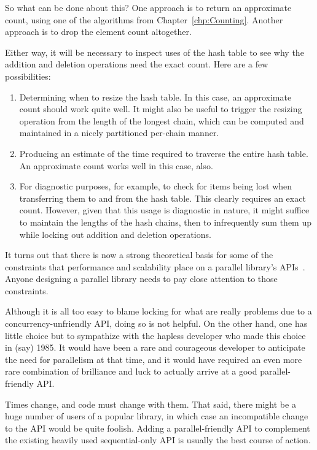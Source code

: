 So what can be done about this?
One approach is to return an approximate count, using one of the algorithms
from Chapter~\ref{chp:Counting}.
Another approach is to drop the element count altogether.

Either way, it will be necessary to inspect uses of the hash table to see
why the addition and deletion operations need the exact count.
Here are a few possibilities:

\begin{enumerate}
\item	Determining when to resize the hash table.
	In this case, an approximate count should work quite well.
	It might also be useful to trigger the resizing operation from
	the length of the longest chain, which can be computed and
	maintained in a nicely partitioned per-chain manner.
\item	Producing an estimate of the time required to traverse the
	entire hash table.
	An approximate count works well in this case, also.
\item	For diagnostic purposes, for example, to check for items being
	lost when transferring them to and from the hash table.
	This clearly requires an exact count.
	However, given that this usage is diagnostic in nature, it might
	suffice to maintain the lengths of the hash chains, then to
	infrequently sum them
	up while locking out addition and deletion operations.
\end{enumerate}

It turns out that there is now a strong theoretical basis for some of the
constraints that performance and scalability place on a parallel library's
APIs~\cite{HagitAttiya2011LawsOfOrder,Attiya:2011:LOE:1925844.1926442,PaulEMcKenney2011SNC}.
Anyone designing a parallel library needs to pay close attention to
those constraints.

Although it is all too easy to blame locking for what are really problems
due to a concurrency-unfriendly API, doing so is not helpful.
On the other hand, one has little choice but to sympathize with the
hapless developer who made this choice in (say) 1985.
It would have been a rare and courageous developer to anticipate the
need for parallelism at that time, and it would have required an
even more rare combination of brilliance and luck to actually arrive
at a good parallel-friendly API\@.

Times change, and code must change with them.
That said, there might be a huge number of users of a popular library,
in which case an incompatible change to the API would be quite foolish.
Adding a parallel-friendly API to complement the existing heavily used
sequential-only API is usually the best course of action.

